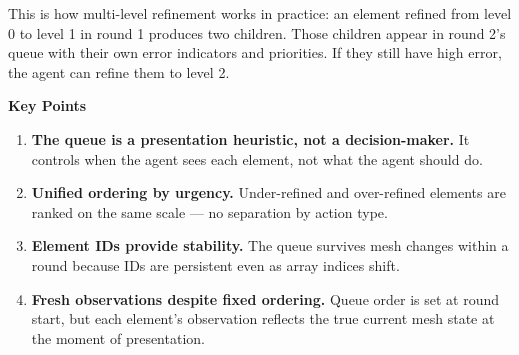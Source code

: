 \documentclass[11pt]{article}
\begin{document}
\noindent This is how multi-level refinement works in practice: an element refined from level 0 to level 1 in round 1 produces two children. Those children appear in round 2's queue with their own error indicators and priorities. If they still have high error, the agent can refine them to level 2.

\vspace{0.5cm}
\noindent\textbf{Key Points}

\begin{enumerate}[leftmargin=1.5em, itemsep=4pt]
    \item \textbf{The queue is a presentation heuristic, not a decision-maker.} It controls when the agent sees each element, not what the agent should do.
    \item \textbf{Unified ordering by urgency.} Under-refined and over-refined elements are ranked on the same scale --- no separation by action type.
    \item \textbf{Element IDs provide stability.} The queue survives mesh changes within a round because IDs are persistent even as array indices shift.
    \item \textbf{Fresh observations despite fixed ordering.} Queue order is set at round start, but each element's observation reflects the true current mesh state at the moment of presentation.
\end{enumerate}
\end{document}
